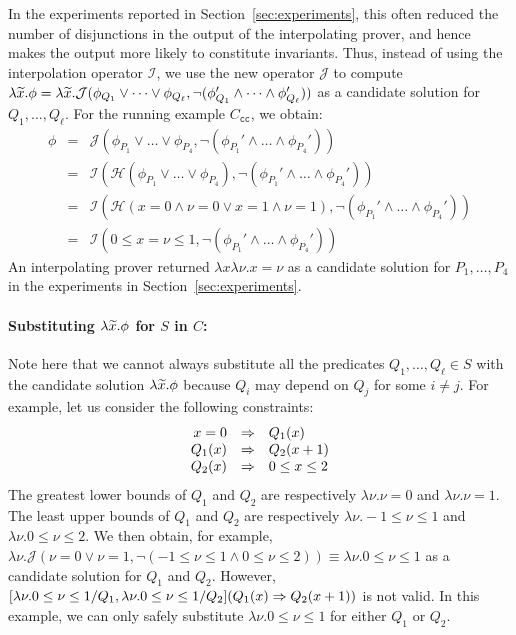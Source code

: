 In the experiments reported in Section~\ref{sec:experiments}, this often
reduced the number of disjunctions in the output of the interpolating
prover, and hence makes the output more likely to constitute invariants.
%
Thus, instead of using the interpolation operator \(\mathcal{I}\), we
use the new operator \(\mathcal{J}\) to compute \(\lambda \widetilde{x}.
\phi=\lambda\widetilde{x}.\mathcal{J}(\phi_{Q_1} \lor \dots\lor
\phi_{Q_{\ell}},\neg (\phi_{Q_1}' \land \dots \land\phi_{Q_{\ell}}'))\)
as a candidate solution for \(Q_1,\dots,Q_{\ell}\).  For the running
example \(C_{\texttt{cc}}\), we obtain:
\[
\begin{array}{rcl}
\phi &=& \mathcal{J}(\phi_{P_1} \lor \dots \lor \phi_{P_4},\neg (\phi_{P_1}' \land \dots \land \phi_{P_4}')) \\
&=& \mathcal{I}(\mathcal{H}(\phi_{P_1} \lor \dots \lor \phi_{P_4}),\neg (\phi_{P_1}' \land \dots \land \phi_{P_4}')) \\
&=& \mathcal{I}(\mathcal{H}(x=0 \land \nu=0 \lor x=1 \land \nu=1),\neg (\phi_{P_1}' \land \dots \land \phi_{P_4}')) \\
&=& \mathcal{I}(0 \leq x=\nu \leq 1,\neg (\phi_{P_1}' \land \dots \land \phi_{P_4}'))
\end{array}
\]
An interpolating prover returned \(\lambda x \lambda \nu.x=\nu\) as a
candidate solution for \(P_1,\dots,P_4\) in the experiments in
Section~\ref{sec:experiments}.

\paragraph{Substituting \(\lambda \widetilde{x}.\phi\) for \(S\) in \(C\):}
Note here that we cannot always substitute all the predicates
\(Q_1,\dots,Q_{\ell} \in S\) with the candidate solution \(\lambda
\widetilde{x}.\phi\) because \(Q_i\) may depend on \(Q_j\) for some \(i \neq
j\).  For example, let us consider the following constraints:
\[
\begin{array}{rcl}
x=0 &\Rightarrow& Q_1(x) \\
Q_1(x) &\Rightarrow& Q_2(x+1) \\
Q_2(x) &\Rightarrow& 0 \leq x \leq 2
\end{array}
\]
The greatest lower bounds of \(Q_1\) and \(Q_2\) are respectively
\(\lambda \nu.\nu=0\) and \(\lambda \nu.\nu=1\).  The least upper bounds
of \(Q_1\) and \(Q_2\) are respectively \(\lambda \nu.-1 \leq \nu\leq 1\)
and \(\lambda \nu.0 \leq \nu \leq 2\).  We then obtain, for example,
\(\lambda \nu.\mathcal{J}(\nu=0 \lor \nu=1,\neg (-1 \leq \nu\leq 1 \land
0 \leq \nu \leq 2)) \equiv \lambda \nu.0 \leq \nu \leq 1\) as a
candidate solution for \(Q_1\) and \(Q_2\).  However, \([\lambda\nu.0
\leq \nu \leq 1/Q_1,\lambda \nu.0 \leq \nu \leq 1/Q_2](Q_1(x) \Rightarrow
Q_2(x+1))\) is not valid.  In this example, we can only safely
substitute \(\lambda \nu.0 \leq \nu\leq 1\) for either \(Q_1\) or \(Q_2\).

